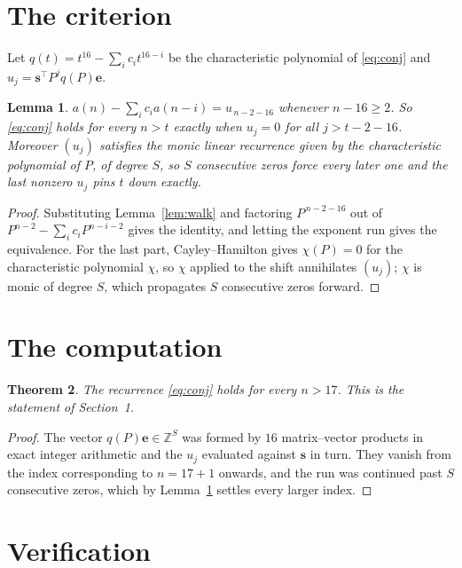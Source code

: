 \documentclass[11pt,a4paper]{article}
\theoremstyle{plain}
\newtheorem{theorem}{Theorem}
\newtheorem{lemma}[theorem]{Lemma}
\theoremstyle{definition}
\begin{document}
\section{The criterion}

Let $q(t)=t^{16}-\sum_i c_i t^{16-i}$ be the characteristic polynomial of
\eqref{eq:conj} and $u_j=\mathbf{s}^{\!\top}P^{j}q(P)\mathbf{e}$.

\begin{lemma}\label{lem:crit}
$a(n)-\sum_i c_i a(n-i)=u_{\,n-2-16}$ whenever $n-16\ge2$. So \eqref{eq:conj}
holds for every $n>t$ exactly when $u_j=0$ for all $j>t-2-16$. Moreover $(u_j)$
satisfies the monic linear recurrence given by the characteristic polynomial of $P$, of
degree $S$, so $S$ consecutive zeros force every later one and the last nonzero $u_j$ pins
$t$ down exactly.
\end{lemma}

\begin{proof}
Substituting Lemma~\ref{lem:walk} and factoring $P^{\,n-2-16}$ out of
$P^{n-2}-\sum_i c_i P^{n-i-2}$ gives the identity, and letting the exponent run gives the
equivalence. For the last part, Cayley--Hamilton gives $\chi(P)=0$ for the characteristic
polynomial $\chi$, so $\chi$ applied to the shift annihilates $(u_j)$; $\chi$ is monic of
degree $S$, which propagates $S$ consecutive zeros forward.
\end{proof}

\section{The computation}

\begin{theorem}
The recurrence \eqref{eq:conj} holds for every $n>17$. This is the statement of
Section~1.
\end{theorem}

\begin{proof}
The vector $q(P)\mathbf{e}\in\mathbb{Z}^{S}$ was formed by $16$ matrix--vector
products in exact integer arithmetic and the $u_j$ evaluated against $\mathbf{s}$ in turn.
They vanish from the index corresponding to $n=17+1$ onwards, and the run was continued
past $S$ consecutive zeros, which by Lemma~\ref{lem:crit} settles every larger index.
\end{proof}

\section{Verification}
\end{document}
